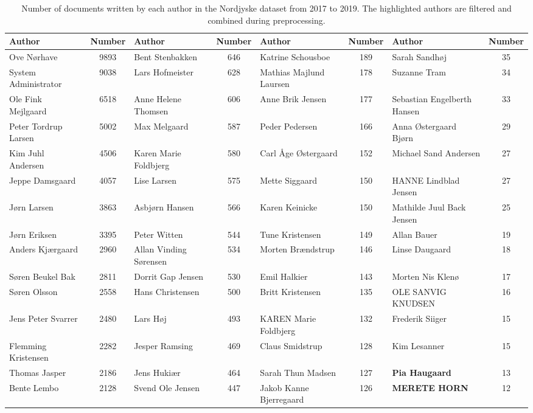 \begin{table}[h]
	\caption{Number of documents written by each author in the Nordjyske dataset from 2017 to 2019.
	The highlighted authors are filtered and combined during preprocessing.}
	\label{tab:author_table}
	\centering
	\scriptsize
	\begin{tabular}{l|c|l|c|l|c|l|c}
		Author                & Number & Author                     & Number & Author                       & Number & Author                       & Number \\
		\midrule
		Ove Nørhave & 9893 & Bent Stenbakken & 646 & Katrine Schousboe & 189 & Sarah Sandhøj & 35 \\
		System Administrator & 9038 & Lars Hofmeister & 628 & Mathias Majlund Laursen & 178 & Suzanne Tram & 34 \\
		Ole Fink Mejlgaard & 6518 & Anne Helene Thomsen & 606 & Anne Brik Jensen & 177 & Sebastian Engelberth Hansen & 33 \\
		Peter Tordrup Larsen & 5002 & Max Melgaard & 587 & Peder Pedersen & 166 & Anna Østergaard Bjørn & 29 \\
		Kim Juhl Andersen & 4506 & Karen Marie Foldbjerg & 580 & Carl Åge Østergaard & 152 & Michael Sand Andersen & 27 \\
		Jeppe Damsgaard & 4057 & Lise Larsen & 575 & Mette Siggaard & 150 & HANNE Lindblad Jensen & 27 \\
		Jørn Larsen & 3863 & Asbjørn Hansen & 566 & Karen Keinicke & 150 & Mathilde Juul Back Jensen & 25 \\
		Jørn Eriksen & 3395 & Peter Witten & 544 & Tune Kristensen & 149 & Allan Bauer & 19 \\
		Anders Kjærgaard & 2960 & Allan Vinding Sørensen & 534 & Morten Brændstrup & 146 & Linse Daugaard & 18 \\
		Søren Beukel Bak & 2811 & Dorrit Gap Jensen & 530 & Emil Halkier & 143 & Morten Nis Klenø & 17 \\
		Søren Olsson & 2558 & Hans Christensen & 500 & Britt Kristensen & 135 & OLE SANVIG KNUDSEN & 16 \\
		Jens Peter Svarrer & 2480 & Lars Høj & 493 & KAREN Marie Foldbjerg & 132 & Frederik Siiger & 15 \\
		Flemming Kristensen & 2282 & Jesper Ramsing & 469 & Claus Smidstrup & 128 & Kim Lesanner & 15 \\
		Thomas Jasper & 2186 & Jens Hukiær & 464 & Sarah Thun Madsen & 127 & \textbf{Pia Haugaard} & 13 \\
		Bente Lembo & 2128 & Svend Ole Jensen & 447 & Jakob Kanne Bjerregaard & 126 & \textbf{MERETE HORN} & 12 \\

\end{tabular}
\end{table}
